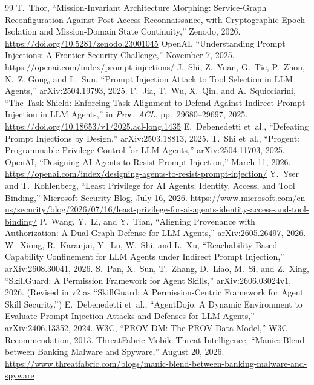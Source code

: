 \documentclass[11pt,letterpaper]{article}
\theoremstyle{definition}
\begin{document}
\begin{thebibliography}{99}
 T.~Thor, ``Mission-Invariant Architecture Morphing: Service-Graph Reconfiguration Against Post-Access Reconnaissance, with Cryptographic Epoch Isolation and Mission-Domain State Continuity,'' Zenodo, 2026. \url{https://doi.org/10.5281/zenodo.23001045}
 OpenAI, ``Understanding Prompt Injections: A Frontier Security Challenge,'' November 7, 2025. \url{https://openai.com/index/prompt-injections/}
 J.~Shi, Z.~Yuan, G.~Tie, P.~Zhou, N.~Z. Gong, and L.~Sun, ``Prompt Injection Attack to Tool Selection in LLM Agents,'' arXiv:2504.19793, 2025.
 F.~Jia, T.~Wu, X.~Qin, and A.~Squicciarini, ``The Task Shield: Enforcing Task Alignment to Defend Against Indirect Prompt Injection in LLM Agents,'' in \emph{Proc. ACL}, pp.~29680--29697, 2025. \url{https://doi.org/10.18653/v1/2025.acl-long.1435}
 E.~Debenedetti et~al., ``Defeating Prompt Injections by Design,'' arXiv:2503.18813, 2025.
 T.~Shi et~al., ``Progent: Programmable Privilege Control for LLM Agents,'' arXiv:2504.11703, 2025.
 OpenAI, ``Designing AI Agents to Resist Prompt Injection,'' March 11, 2026. \url{https://openai.com/index/designing-agents-to-resist-prompt-injection/}
 Y.~Yser and T.~Kohlenberg, ``Least Privilege for AI Agents: Identity, Access, and Tool Binding,'' Microsoft Security Blog, July 16, 2026. \url{https://www.microsoft.com/en-us/security/blog/2026/07/16/least-privilege-for-ai-agents-identity-access-and-tool-binding/}
 P.~Wang, Y.~Li, and Y.~Tian, ``Aligning Provenance with Authorization: A Dual-Graph Defense for LLM Agents,'' arXiv:2605.26497, 2026.
 W.~Xiong, R.~Karanjai, Y.~Lu, W.~Shi, and L.~Xu, ``Reachability-Based Capability Confinement for LLM Agents under Indirect Prompt Injection,'' arXiv:2608.30041, 2026.
 S.~Pan, X.~Sun, T.~Zhang, D.~Liao, M.~Si, and Z.~Xing, ``SkillGuard: A Permission Framework for Agent Skills,'' arXiv:2606.03024v1, 2026. (Revised in v2 as ``SkillGuard: A Permission-Centric Framework for Agent Skill Security.'')
 E.~Debenedetti et~al., ``AgentDojo: A Dynamic Environment to Evaluate Prompt Injection Attacks and Defenses for LLM Agents,'' arXiv:2406.13352, 2024.
 W3C, ``PROV-DM: The PROV Data Model,'' W3C Recommendation, 2013.
 ThreatFabric Mobile Threat Intelligence, ``Manic: Blend between Banking Malware and Spyware,'' August 20, 2026. \url{https://www.threatfabric.com/blogs/manic-blend-between-banking-malware-and-spyware}
\end{thebibliography}
\normalsize
\end{document}
